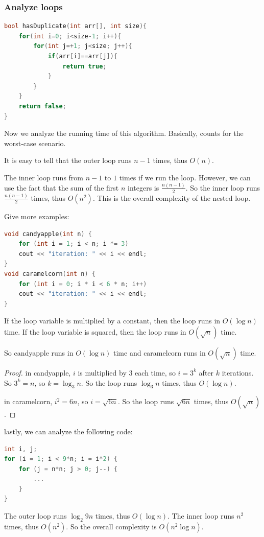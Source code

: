 \documentclass[letterpaper,12pt]{article}
\begin{document}
\subsubsection{Analyze loops}
\begin{lstlisting}[language=C++]
bool hasDuplicate(int arr[], int size){
    for(int i=0; i<size-1; i++){
        for(int j=+1; j<size; j++){
            if(arr[i]==arr[j]){
                return true;
            }
        }
    }
    return false;
}
\end{lstlisting}

Now we analyze the running time of this algorithm. Basically, counts for the worst-case scenario.

It is easy to tell that the outer loop runs $n-1$ times, thus $O(n)$.

The inner loop runs from $n-1$ to $1$ times if we run the loop. However, we can use the fact that the sum of the first $n$ integers is $\frac{n(n-1)}{2}$. So the inner loop runs $\frac{n(n-1)}{2}$ times, thus $O(n^2)$. This is the overall complexity of the nested loop.

Give more examples:\begin{lstlisting}[language=C++]
void candyapple(int n) {
    for (int i = 1; i < n; i *= 3)
    cout << "iteration: " << i << endl;
}
void caramelcorn(int n) {
    for (int i = 0; i * i < 6 * n; i++)
    cout << "iteration: " << i << endl;
}         
\end{lstlisting}
If the loop variable is multiplied by a constant, then the loop runs in $O(\log n)$ time. If the loop variable is squared, then the loop runs in $O(\sqrt{n})$ time.

So candyapple runs in $O(\log n)$ time and caramelcorn runs in $O(\sqrt{n})$ time.
\begin{proof}

    in candyapple, $i$ is multiplied by 3 each time, so $i=3^k$ after $k$ iterations. So $3^k=n$, so $k=\log_3 n$. So the loop runs $\log_3 n$ times, thus $O(\log n)$.

    in caramelcorn, $i^2=6n$, so $i=\sqrt{6n}$. So the loop runs $\sqrt{6n}$ times, thus $O(\sqrt{n})$.
\end{proof}

lastly, we can analyze the following code:\begin{lstlisting}[language=C++]
int i, j;
for (i = 1; i < 9*n; i = i*2) {
    for (j = n*n; j > 0; j--) {
        ...
    }
}
\end{lstlisting}
The outer loop runs $\log_2 9n$ times, thus $O(\log n)$. The inner loop runs $n^2$ times, thus $O(n^2)$. So the overall complexity is $O(n^2\log n)$.
\end{document}
